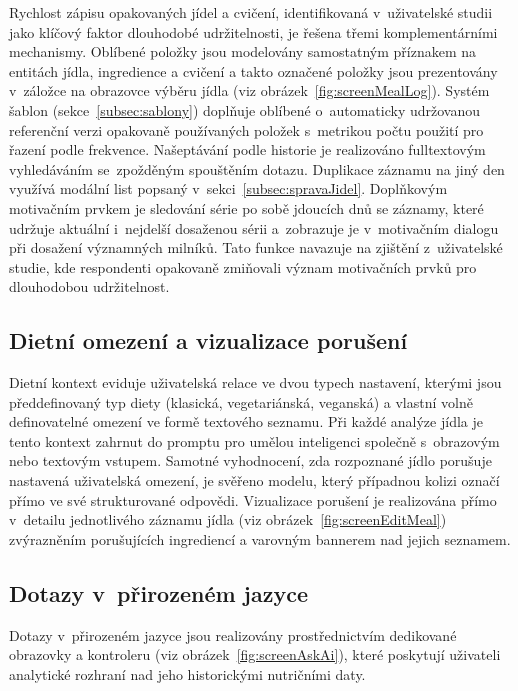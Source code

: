 Rychlost zápisu opakovaných jídel a cvičení, identifikovaná v~uživatelské studii jako klíčový faktor dlouhodobé udržitelnosti, je řešena třemi komplementárními mechanismy.
Oblíbené položky jsou modelovány samostatným příznakem na entitách jídla, ingredience a cvičení a takto označené položky jsou prezentovány v~záložce  na obrazovce výběru jídla (viz obrázek~\ref{fig:screenMealLog}).
Systém šablon (sekce~\ref{subsec:sablony}) doplňuje oblíbené o~automaticky udržovanou referenční verzi opakovaně používaných položek s~metrikou počtu použití pro řazení podle frekvence.
Našeptávání podle historie je realizováno fulltextovým vyhledáváním se~zpožděným spouštěním dotazu.
Duplikace záznamu na jiný den využívá modální list popsaný v~sekci~\ref{subsec:spravaJidel}.
Doplňkovým motivačním prvkem je sledování série po sobě jdoucích dnů se záznamy, které udržuje aktuální i~nejdelší dosaženou sérii a~zobrazuje je v~motivačním dialogu při dosažení významných milníků.
Tato funkce navazuje na zjištění z~uživatelské studie, kde respondenti opakovaně zmiňovali význam motivačních prvků pro dlouhodobou udržitelnost.

\subsection{Dietní omezení a vizualizace porušení}
\label{subsec:dietniOmezeni}

Dietní kontext eviduje uživatelská relace ve dvou typech nastavení, kterými jsou předdefinovaný typ diety (klasická, vegetariánská, veganská) a vlastní volně definovatelné omezení ve formě textového seznamu.
Při každé analýze jídla je tento kontext zahrnut do promptu pro umělou inteligenci společně s~obrazovým nebo textovým vstupem.
Samotné vyhodnocení, zda rozpoznané jídlo porušuje nastavená uživatelská omezení, je svěřeno modelu, který případnou kolizi označí přímo ve své strukturované odpovědi.
Vizualizace porušení je realizována přímo v~detailu jednotlivého záznamu jídla (viz obrázek~\ref{fig:screenEditMeal}) zvýrazněním porušujících ingrediencí a varovným bannerem nad jejich seznamem.

\subsection{Dotazy v~přirozeném jazyce}
\label{subsec:askAi}

Dotazy v~přirozeném jazyce jsou realizovány prostřednictvím dedikované obrazovky a kontroleru (viz obrázek~\ref{fig:screenAskAi}), které poskytují uživateli analytické rozhraní nad jeho historickými nutričními daty.

